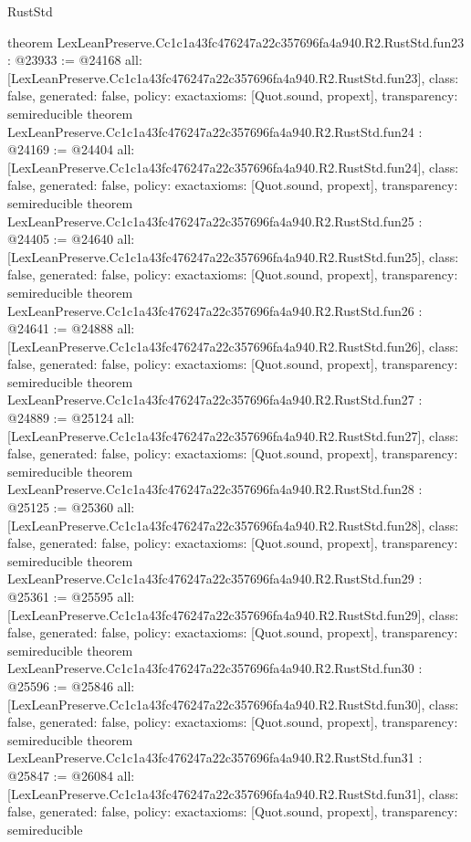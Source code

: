 \begin{lexlean}{RustStd}
\begin{coremodule}
{}
theorem LexLeanPreserve.Cc1c1a43fc476247a22c357696fa4a940.R2.RustStd.fun23 : @23933 := @24168 {
  all: [LexLeanPreserve.Cc1c1a43fc476247a22c357696fa4a940.R2.RustStd.fun23],
  class: false,
  generated: false,
  policy: exact{axioms: [Quot.sound, propext]},
  transparency: semireducible
}
theorem LexLeanPreserve.Cc1c1a43fc476247a22c357696fa4a940.R2.RustStd.fun24 : @24169 := @24404 {
  all: [LexLeanPreserve.Cc1c1a43fc476247a22c357696fa4a940.R2.RustStd.fun24],
  class: false,
  generated: false,
  policy: exact{axioms: [Quot.sound, propext]},
  transparency: semireducible
}
theorem LexLeanPreserve.Cc1c1a43fc476247a22c357696fa4a940.R2.RustStd.fun25 : @24405 := @24640 {
  all: [LexLeanPreserve.Cc1c1a43fc476247a22c357696fa4a940.R2.RustStd.fun25],
  class: false,
  generated: false,
  policy: exact{axioms: [Quot.sound, propext]},
  transparency: semireducible
}
theorem LexLeanPreserve.Cc1c1a43fc476247a22c357696fa4a940.R2.RustStd.fun26 : @24641 := @24888 {
  all: [LexLeanPreserve.Cc1c1a43fc476247a22c357696fa4a940.R2.RustStd.fun26],
  class: false,
  generated: false,
  policy: exact{axioms: [Quot.sound, propext]},
  transparency: semireducible
}
theorem LexLeanPreserve.Cc1c1a43fc476247a22c357696fa4a940.R2.RustStd.fun27 : @24889 := @25124 {
  all: [LexLeanPreserve.Cc1c1a43fc476247a22c357696fa4a940.R2.RustStd.fun27],
  class: false,
  generated: false,
  policy: exact{axioms: [Quot.sound, propext]},
  transparency: semireducible
}
theorem LexLeanPreserve.Cc1c1a43fc476247a22c357696fa4a940.R2.RustStd.fun28 : @25125 := @25360 {
  all: [LexLeanPreserve.Cc1c1a43fc476247a22c357696fa4a940.R2.RustStd.fun28],
  class: false,
  generated: false,
  policy: exact{axioms: [Quot.sound, propext]},
  transparency: semireducible
}
theorem LexLeanPreserve.Cc1c1a43fc476247a22c357696fa4a940.R2.RustStd.fun29 : @25361 := @25595 {
  all: [LexLeanPreserve.Cc1c1a43fc476247a22c357696fa4a940.R2.RustStd.fun29],
  class: false,
  generated: false,
  policy: exact{axioms: [Quot.sound, propext]},
  transparency: semireducible
}
theorem LexLeanPreserve.Cc1c1a43fc476247a22c357696fa4a940.R2.RustStd.fun30 : @25596 := @25846 {
  all: [LexLeanPreserve.Cc1c1a43fc476247a22c357696fa4a940.R2.RustStd.fun30],
  class: false,
  generated: false,
  policy: exact{axioms: [Quot.sound, propext]},
  transparency: semireducible
}
theorem LexLeanPreserve.Cc1c1a43fc476247a22c357696fa4a940.R2.RustStd.fun31 : @25847 := @26084 {
  all: [LexLeanPreserve.Cc1c1a43fc476247a22c357696fa4a940.R2.RustStd.fun31],
  class: false,
  generated: false,
  policy: exact{axioms: [Quot.sound, propext]},
  transparency: semireducible
}
\end{coremodule}
\end{lexlean}
